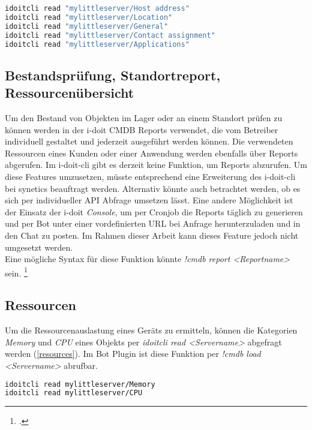 \begin{lstlisting}[language=bash, label=show, caption=Detailansicht eines Objekts mit i-doit-cli]
idoitcli read "mylittleserver/Host address"
idoitcli read "mylittleserver/Location"
idoitcli read "mylittleserver/General"
idoitcli read "mylittleserver/Contact assignment"
idoitcli read "mylittleserver/Applications"
\end{lstlisting}

\subsection{Bestandsprüfung, Standortreport, Ressourcenübersicht}
Um den Bestand von Objekten im Lager oder an einem Standort prüfen zu können werden in der i-doit \acs{CMDB} Reports verwendet, die vom Betreiber individuell gestaltet und jederzeit ausgeführt werden können. Die verwendeten Ressourcen eines Kunden oder einer Anwendung werden ebenfalls über Reports abgerufen.  Im i-doit-cli gibt es derzeit keine Funktion, um Reports abzurufen. Um diese Features umzusetzen, müsste entsprechend eine Erweiterung des i-doit-cli bei synetics beauftragt werden. Alternativ könnte auch betrachtet werden, ob es sich per individueller API Abfrage umsetzen lässt. Eine andere Möglichkeit ist der Einsatz der i-doit \textit{Console}, um per Cronjob die Reports täglich zu generieren und per Bot unter einer vordefinierten URL bei Anfrage herunterzuladen und in den Chat zu posten. Im Rahmen dieser Arbeit kann dieses Feature jedoch nicht umgesetzt werden.\\
Eine mögliche Syntax für diese Funktion könnte \textit{!cmdb report <Reportname>} sein. 
\footcites[Vgl.][o. \pno]{idoit_2019_report}[Vgl.][o. \pno]{idoit_2019_console}

\subsection{Ressourcen}
Um die Ressourcenauslastung eines Geräts zu ermitteln, können die Kategorien \textit{Memory} und \textit{CPU} eines Objekts per \textit{idoitcli read <Servername>} abgefragt werden (\autoref{resources}). Im Bot Plugin ist diese Funktion per \textit{!cmdb load <Servername>} abrufbar. 

\begin{lstlisting}[language=bash, label=resources, caption=Ressourcenauslastung eines Geräts]
idoitcli read mylittleserver/Memory
idoitcli read mylittleserver/CPU
\end{lstlisting}

